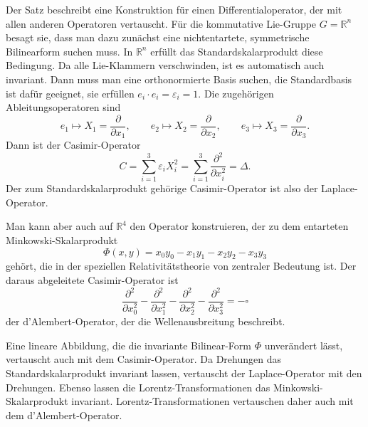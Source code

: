 Der Satz beschreibt eine Konstruktion für einen Differentialoperator,
der mit allen anderen Operatoren vertauscht.
Für die kommutative Lie-Gruppe $G=\mathbb{R}^n$ besagt sie, dass man
dazu zunächst eine nichtentartete, symmetrische Bilinearform suchen muss.
In $\mathbb{R}^n$ erfüllt das Standardskalarprodukt diese Bedingung.
Da alle Lie-Klammern verschwinden, ist es automatisch auch invariant.
Dann muss man eine orthonormierte Basis suchen, die Standardbasis
ist dafür geeignet, sie erfüllen $e_i\cdot e_i=\varepsilon_i=1$.
Die zugehörigen Ableitungsoperatoren sind
\[
e_1 \mapsto X_1 = \frac{\partial}{\partial x_1},
\qquad
e_2 \mapsto X_2 = \frac{\partial}{\partial x_2},
\qquad
e_3 \mapsto X_3 = \frac{\partial}{\partial x_3}.
\]
Dann ist der Casimir-Operator
\[
C=
\sum_{i=1}^3 \varepsilon_i X_i^2
=
\sum_{i=1}^3 \frac{\partial^2}{\partial x_i^2}
=
\Delta.
\]
Der zum Standardskalarprodukt gehörige Casimir-Operator ist also
der Laplace-Operator.

Man kann aber auch auf $\mathbb{R}^4$ den Operator konstruieren, der
zu dem entarteten Min\-kow\-ski-Ska\-lar\-pro\-dukt
\[
\Phi(x,y)
=
x_0y_0
-
x_1y_1
-
x_2y_2
-
x_3y_3
\]
gehört, die in der speziellen Relativitätstheorie von zentraler Bedeutung
ist.
Der daraus abgeleitete Casimir-Operator ist
\[
\frac{\partial^2}{\partial x_0^2}
-
\frac{\partial^2}{\partial x_1^2}
-
\frac{\partial^2}{\partial x_2^2}
-
\frac{\partial^2}{\partial x_3^2}
=
-\square
\]
der d'Alembert-Operator, der die Wellenausbreitung beschreibt.

Eine lineare Abbildung, die die invariante Bilinear-Form $\Phi$ unverändert
lässt, vertauscht auch mit dem Casimir-Operator.
Da Drehungen das Standardskalarprodukt invariant lassen, vertauscht
der Laplace-Operator mit den Drehungen.
Ebenso lassen die Lorentz-Transformationen das Minkowski-Skalarprodukt
invariant.
Lorentz-Transformationen vertauschen daher auch mit dem d'Alembert-Operator.

